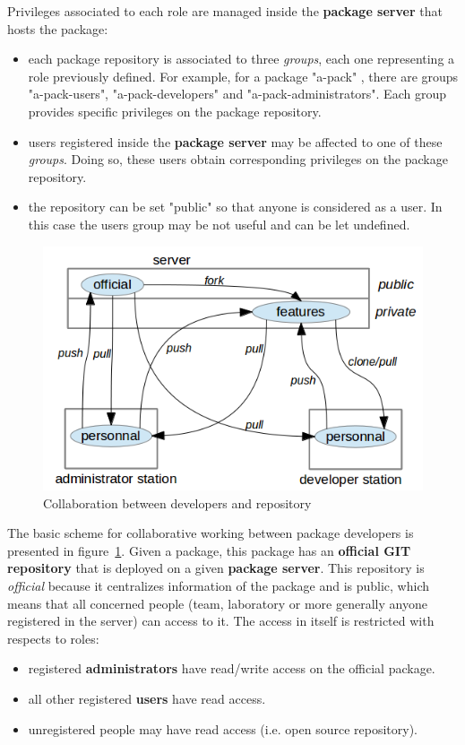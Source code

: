 \documentclass[12pt,a4paper]{article}
\begin{document}
Privileges associated to each role are managed inside the \textbf{package server} that hosts the package: 
\begin{itemize}
\item each package repository is associated to three \textit{groups}, each one representing a role previously defined. For example, for a package "a-pack" , there are groups "a-pack-users", "a-pack-developers" and "a-pack-administrators". Each group provides specific privileges on the package repository.
\item users registered inside the \textbf{package server} may be affected to one of these \textit{groups}. Doing so, these users obtain corresponding privileges on the package repository.
\item the repository can be set "public" so that anyone is considered as a user. In this case the users group may be not useful and can be let undefined.
\end{itemize}

\begin{figure}
\center
\includegraphics[scale=1]{images/collaborativework.png}
\caption{Collaboration between developers and repository}
\label{fig-collab}
\end{figure}

The basic scheme for collaborative working between package developers is presented in figure~\ref{fig-collab}. 
Given a package, this package has an \textbf{official GIT repository} that is deployed on a given \textbf{package server}. This repository is \textit{official} because it centralizes information of the package and is public, which means that all concerned people (team, laboratory or more generally anyone registered in the server) can access to it. The access in itself is restricted with respects to roles:
\begin{itemize}
\item registered \textbf{administrators} have read/write access on the official package.
\item all other registered \textbf{users} have read access.
\item unregistered people may have read access (i.e. open source repository).
\end{itemize}
\end{document}
